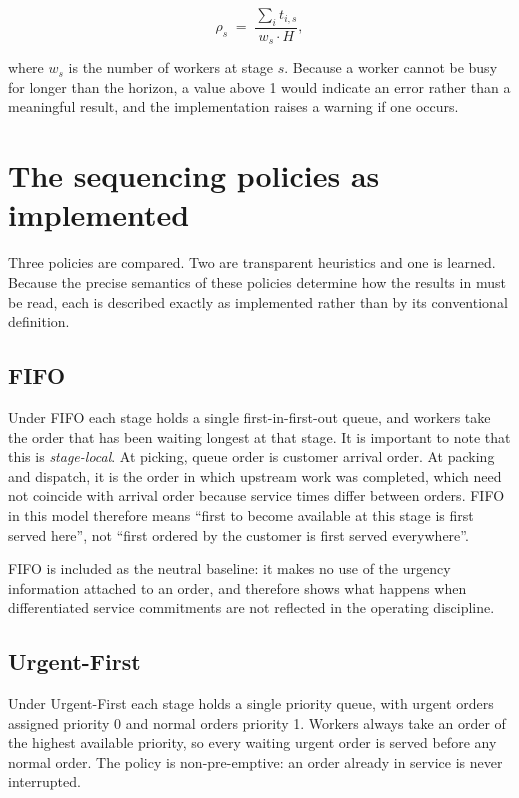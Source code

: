 \begin{equation}
\rho_s \;=\; \frac{\sum_{i} t_{i,s}}{w_s \cdot H},
\label{eq:utilisation}
\end{equation}

\noindent where \(w_s\) is the number of workers at stage \(s\). Because a worker cannot be
busy for longer than the horizon, a value above \num{1} would indicate an error rather than a
meaningful result, and the implementation raises a warning if one occurs.

\section{The sequencing policies as implemented}
\label{sec:policies}

Three policies are compared. Two are transparent heuristics and one is learned. Because the
precise semantics of these policies determine how the results in  must be
read, each is described exactly as implemented rather than by its conventional definition.

\subsection{FIFO}

Under FIFO each stage holds a single first-in-first-out queue, and workers take the order that
has been waiting longest at that stage. It is important to note that this is
\emph{stage-local}. At picking, queue order is customer arrival order. At packing and dispatch,
it is the order in which upstream work was completed, which need not coincide with arrival
order because service times differ between orders. FIFO in this model therefore means
``first to become available at this stage is first served here'', not ``first ordered by the
customer is first served everywhere''.

FIFO is included as the neutral baseline: it makes no use of the urgency information attached
to an order, and therefore shows what happens when differentiated service commitments are not
reflected in the operating discipline.

\subsection{Urgent-First}
\label{sec:urgent-first}

Under Urgent-First each stage holds a single priority queue, with urgent orders assigned
priority \num{0} and normal orders priority \num{1}. Workers always take an order of the
highest available priority, so every waiting urgent order is served before any normal order.
The policy is non-pre-emptive: an order already in service is never interrupted.

